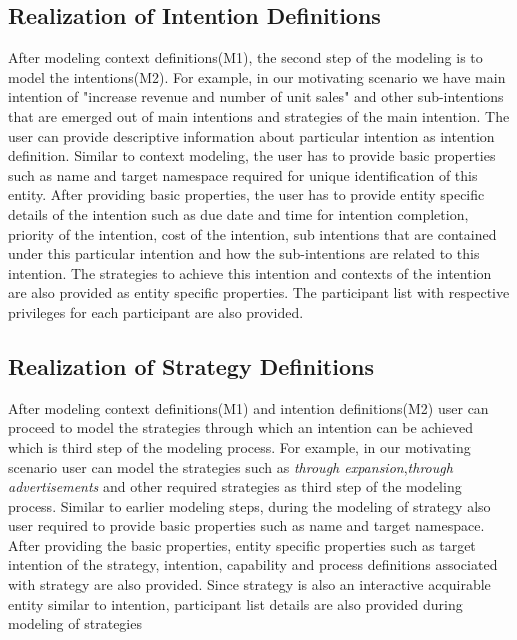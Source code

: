 \subsection{Realization of Intention Definitions}
After modeling context definitions(M1), the second step of the modeling is to model the intentions(M2). For example, in our motivating scenario we have main intention of "increase revenue and number of unit sales" and other sub-intentions that are emerged out of main intentions and strategies of the main intention. The user can provide descriptive information about particular intention as intention definition. Similar to context modeling, the user has to provide basic properties such as name and target namespace required for unique identification of this entity. After providing basic properties, the user has to provide entity specific details of the intention such as due date and time for intention completion, priority of the intention, cost of the intention, sub intentions that are contained under this particular intention and how the sub-intentions are related to this intention. The strategies to achieve this intention and contexts of the intention are also provided as entity specific properties. The participant list with respective privileges for each participant are also provided. 

\subsection{Realization of Strategy Definitions}
After modeling context definitions(M1) and intention definitions(M2) user can proceed to model the strategies through which an intention can be achieved which is third step of the modeling process. For example, in our motivating scenario user can model the strategies such as \textit{through expansion},\textit{through advertisements} and other required strategies as third step of the modeling process. Similar to earlier modeling steps, during the modeling of strategy also user required to provide basic properties such as name and target namespace. After providing the basic properties, entity specific properties such as target intention of the strategy, intention, capability and process definitions associated with strategy are also provided. Since strategy is also an interactive acquirable entity similar to intention, participant list details are also provided during modeling of strategies

